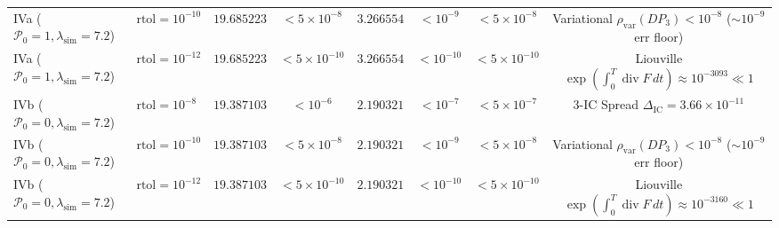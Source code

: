 \documentclass[11pt,a4paper]{article}
\theoremstyle{definition}
\begin{document}
\begin{table}[ht!]
{\begin{tabular}{llcccccc}
IVa ($\mathcal{P}_0=1, \lambda_{\mathrm{sim}}=7.2$)  & $\mathrm{rtol}=10^{-10}$ & $19.685223$ & $< 5 \times 10^{-8}$  & $3.266554$ & $< 10^{-9}$  & $< 5 \times 10^{-8}$  & Variational $\rho_{\mathrm{var}}(DP_3) < 10^{-8}$ ($\sim 10^{-9}$ err floor) \\
IVa ($\mathcal{P}_0=1, \lambda_{\mathrm{sim}}=7.2$)  & $\mathrm{rtol}=10^{-12}$ & $19.685223$ & $< 5 \times 10^{-10}$ & $3.266554$ & $< 10^{-10}$ & $< 5 \times 10^{-10}$ & Liouville $\exp(\int_0^T \operatorname{div} F\,dt) \approx 10^{-3093} \ll 1$ \\
\midrule
IVb ($\mathcal{P}_0=0, \lambda_{\mathrm{sim}}=7.2$)  & $\mathrm{rtol}=10^{-8}$  & $19.387103$ & $< 10^{-6}$  & $2.190321$ & $< 10^{-7}$  & $< 5 \times 10^{-7}$  & 3-IC Spread $\Delta_{\mathrm{IC}} = 3.66 \times 10^{-11}$ \\
IVb ($\mathcal{P}_0=0, \lambda_{\mathrm{sim}}=7.2$)  & $\mathrm{rtol}=10^{-10}$ & $19.387103$ & $< 5 \times 10^{-8}$  & $2.190321$ & $< 10^{-9}$  & $< 5 \times 10^{-8}$  & Variational $\rho_{\mathrm{var}}(DP_3) < 10^{-8}$ ($\sim 10^{-9}$ err floor) \\
IVb ($\mathcal{P}_0=0, \lambda_{\mathrm{sim}}=7.2$)  & $\mathrm{rtol}=10^{-12}$ & $19.387103$ & $< 5 \times 10^{-10}$ & $2.190321$ & $< 10^{-10}$ & $< 5 \times 10^{-10}$ & Liouville $\exp(\int_0^T \operatorname{div} F\,dt) \approx 10^{-3160} \ll 1$ \\
\bottomrule
\end{tabular}%
}
\end{table}
\end{document}
